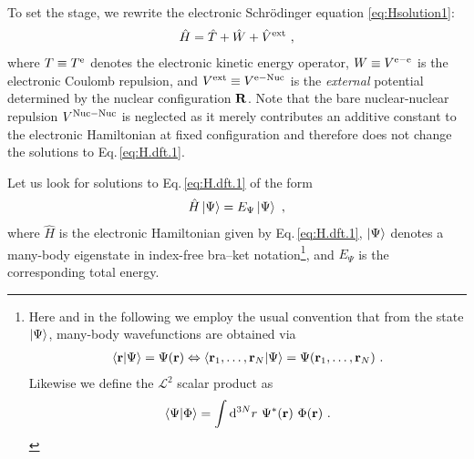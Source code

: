To set the stage, we rewrite the electronic Schr\"odinger equation \eqref{eq:Hsolution1}:
\begin{align}
	\hat H = \hat T + \hat W + \hat V^{\rm ext}~,
	\label{eq:H.dft.1}
\end{align}
where $T \equiv T^{\rm e}$ denotes the electronic kinetic energy operator, $W \equiv V^{\rm e-e}$ is the electronic Coulomb repulsion, and $V^{\rm ext} \equiv V^{\rm e-Nuc}$ is the \emph{external} potential determined by the nuclear configuration $\bf R$. Note that the bare nuclear-nuclear repulsion $V^{\rm Nuc-Nuc}$ is neglected as it merely contributes an additive constant to the electronic Hamiltonian at fixed configuration and therefore does not change the solutions to Eq.\,\eqref{eq:H.dft.1}.

Let us look for solutions to Eq.\,\eqref{eq:H.dft.1} of the form
\begin{align}
	\hat H \Ket{\Psi} = E_\Psi \Ket{\Psi}~,
	\label{eq:SE.dft.1}
\end{align}
where $\hat H$ is the electronic Hamiltonian given by Eq.\,\eqref{eq:H.dft.1}, $\Ket{\Psi}$ denotes a many-body eigenstate in index-free bra--ket notation\footnote{
	Here and in the following we employ the usual convention that from the state $\Ket{\Psi}$, many-body wavefunctions are obtained via
	\begin{align*}
		\braket{{\bf r} | \Psi} 
			= \Psi ({\bf r})
		\Leftrightarrow
		\braket{{\bf r}_1, \ldots, {\bf r}_N | \Psi} 
			= \Psi({\bf r}_1, \ldots, {\bf r}_N)~.
	\end{align*}
	Likewise we define the $\mathcal{L}^2$ scalar product as
	$$
	\braket{\Psi | \Phi} = \int {\rm d}^{3N} r ~ \Psi^\ast ({\bf r}) \ \Phi({\bf r})~.
	$$	
},
and $E_\Psi$ is the corresponding total energy.


